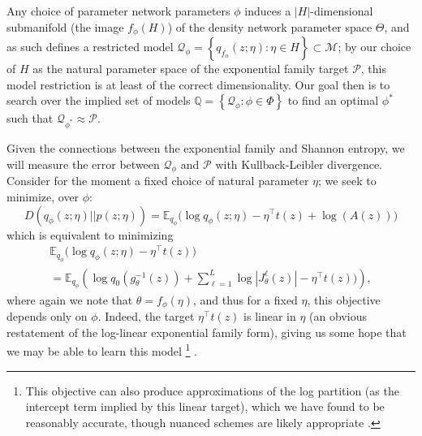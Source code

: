 \documentclass{article}
\begin{document}
Any choice of parameter network parameters $\phi$ induces a $|H|$-dimensional submanifold (the image $f_\phi(H)$) of the density network parameter space $\Theta$, and as such defines a restricted model $\mathcal{Q}_\phi = \left\{ q_{f_{\phi}}(z; \eta): \eta \in H\right\} \subset \mathcal{M}$; by our choice of $H$ as the natural parameter space of the exponential family target $\mathcal{P}$, this model restriction is at least of the correct dimensionality.
Our goal then is to search over the implied set of models $\mathbb{Q} = \left\{ \mathcal{Q}_\phi : \phi \in \Phi \right\}$ to find an optimal $\phi^*$ such that $\mathcal{Q}_{\phi^*} \approx \mathcal{P}$. 

Given the connections between the exponential family and Shannon entropy, we will measure the error between $\mathcal{Q}_{\phi}$ and $\mathcal{P}$ with Kullback-Leibler divergence.  Consider for the moment a fixed choice of natural parameter $\eta$; we seek to minimize, over $\phi$:
{\small 
\begin{equation} D\left( q_\phi(z;\eta) || p(z;\eta) \right) = \mathbb{E}_{q_\phi} \Bigg( \log q_\phi(z;\eta) - \eta^\top t(z) + \log(A(z)) \Bigg) 
\label{eq:5}
\end{equation}}
which is equivalent to minimizing
{\small 
\begin{multline}  
\mathbb{E}_{q_\phi} \Bigg( \log q_\phi(z;\eta) - \eta^\top t(z) \Bigg) \\ = \mathbb{E}_{q_\phi} \left( \log q_0\left( g_\theta^{-1}(z)\right) + \sum_{\ell=1}^L  \log | J^\ell_\theta(z) | - \eta^\top t(z)) \right),
\label{eq:51}
\end{multline}}
where again we note that $\theta = f_\phi(\eta)$, and thus for a fixed $\eta$, this objective depends only on $\phi$.  Indeed, the target $\eta^\top t(z)$ is linear in $\eta$ (an obvious restatement of the log-linear exponential family form), giving us some hope that we may be able to learn this model \footnote{This objective can also produce approximations of the log partition (as the intercept term implied by this linear target), which we have found to be reasonably accurate, though nuanced schemes are likely appropriate \citep{papamakarios2015distilling}.} .
\end{document}
